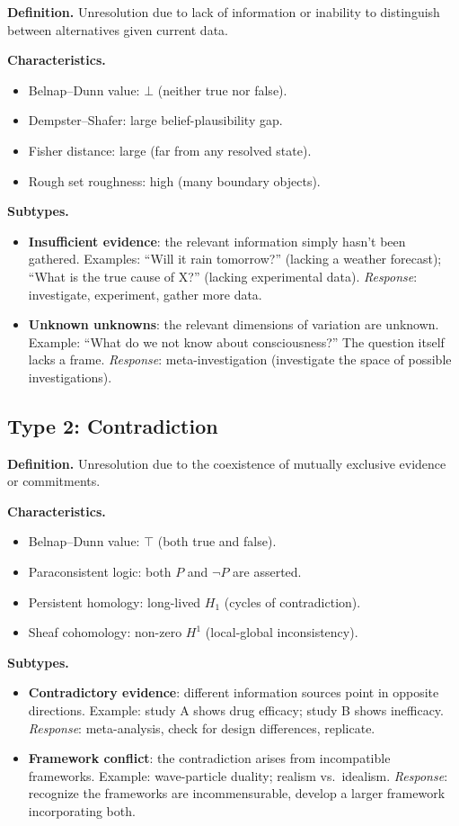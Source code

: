 \documentclass[11pt,letterpaper]{article}
\theoremstyle{definition}
\theoremstyle{remark}
\begin{document}
\textbf{Definition.} Unresolution due to lack of information or inability to distinguish between alternatives given current data.

\textbf{Characteristics.}
\begin{itemize}
\item Belnap--Dunn value: $\bot$ (neither true nor false).
\item Dempster--Shafer: large belief-plausibility gap.
\item Fisher distance: large (far from any resolved state).
\item Rough set roughness: high (many boundary objects).
\end{itemize}

\textbf{Subtypes.}
\begin{itemize}
\item \textbf{Insufficient evidence}: the relevant information simply hasn't been gathered. Examples: ``Will it rain tomorrow?'' (lacking a weather forecast); ``What is the true cause of X?'' (lacking experimental data).
  \emph{Response}: investigate, experiment, gather more data.

\item \textbf{Unknown unknowns}: the relevant dimensions of variation are unknown. Example: ``What do we not know about consciousness?'' The question itself lacks a frame.
  \emph{Response}: meta-investigation (investigate the space of possible investigations).
\end{itemize}

\subsection*{Type 2: Contradiction}

\textbf{Definition.} Unresolution due to the coexistence of mutually exclusive evidence or commitments.

\textbf{Characteristics.}
\begin{itemize}
\item Belnap--Dunn value: $\top$ (both true and false).
\item Paraconsistent logic: both $P$ and $\neg P$ are asserted.
\item Persistent homology: long-lived $H_1$ (cycles of contradiction).
\item Sheaf cohomology: non-zero $H^1$ (local-global inconsistency).
\end{itemize}

\textbf{Subtypes.}
\begin{itemize}
\item \textbf{Contradictory evidence}: different information sources point in opposite directions. Example: study A shows drug efficacy; study B shows inefficacy.
  \emph{Response}: meta-analysis, check for design differences, replicate.

\item \textbf{Framework conflict}: the contradiction arises from incompatible frameworks. Example: wave-particle duality; realism vs.\ idealism.
  \emph{Response}: recognize the frameworks are incommensurable, develop a larger framework incorporating both.
\end{itemize}
\end{document}
